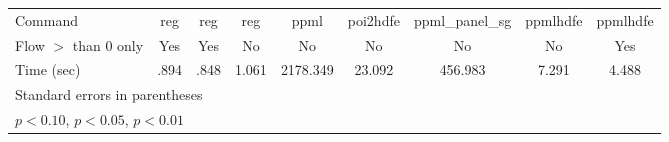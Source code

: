 \begin{table}[htbp]
\begin{tabular}{l*{8}{c}}
Command             &         reg         &         reg         &         reg         &       ppml          &         poi2hdfe    &    ppml\_panel\_sg    &    ppmlhdfe         &    ppmlhdfe         \\
Flow $>$ than 0 only&         Yes         &         Yes         &          No         &       No            &         No          &        No           &          No         &         Yes         \\
Time (sec)          &        .894         &        .848         &       1.061         &       2178.349      &      23.092         &        456.983      &       7.291         &       4.488         \\
\hline\hline
\multicolumn{9}{l}{\footnotesize Standard errors in parentheses}\\
\multicolumn{9}{l}{\footnotesize \sym{*} \(p<0.10\), \sym{**} \(p<0.05\), \sym{***} \(p<0.01\)}\\
\end{tabular}
\end{table}
